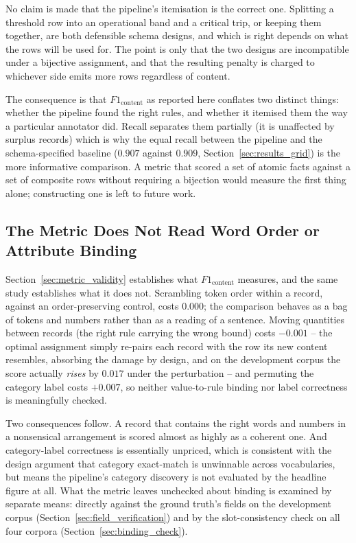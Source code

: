 \documentclass[11pt]{article}
\begin{document}
No claim is made that the pipeline's itemisation is the correct one. Splitting a
threshold row into an operational band and a critical trip, or keeping them
together, are both defensible schema designs, and which is right depends on what
the rows will be used for. The point is only that the two designs are
incompatible under a bijective assignment, and that the resulting penalty is
charged to whichever side emits more rows regardless of content.

The consequence is that $F1_{\text{content}}$ as reported here conflates two
distinct things: whether the pipeline found the right rules, and whether it
itemised them the way a particular annotator did. Recall separates them
partially (it is unaffected by surplus records) which is why the
equal recall between the pipeline and the schema-specified baseline
($0.907$ against $0.909$, Section~\ref{sec:results_grid}) is the more informative
comparison. A metric
that scored a set of atomic facts against a set of composite rows without
requiring a bijection would measure the first thing alone; constructing one is
left to future work.

\subsection{The Metric Does Not Read Word Order or Attribute Binding}
\label{sec:lim_metric_blind}
Section~\ref{sec:metric_validity} establishes what $F1_{\text{content}}$
measures, and the same study establishes what it does not. Scrambling token
order within a record, against an order-preserving control, costs $0.000$; the
comparison behaves as a bag of tokens and numbers rather than as a reading of a
sentence. Moving quantities between records (the right rule carrying the wrong
bound) costs $-0.001$ -- the optimal assignment simply re-pairs each record with
the row its new content resembles, absorbing the damage by design, and on the
development corpus the score actually \emph{rises} by $0.017$ under the
perturbation -- and permuting the category label costs $+0.007$, so
neither value-to-rule binding nor label correctness is meaningfully checked.

Two consequences follow. A record that contains the right words and numbers in a
nonsensical arrangement is scored almost as highly as a coherent one. And
category-label correctness is essentially unpriced, which is consistent with
the design argument that category exact-match is unwinnable across vocabularies,
but means the pipeline's category discovery is not evaluated by the headline
figure at all. What the metric leaves unchecked about binding is examined by
separate means: directly against the ground truth's fields on the development
corpus (Section~\ref{sec:field_verification}) and by the slot-consistency check
on all four corpora (Section~\ref{sec:binding_check}).
\end{document}
